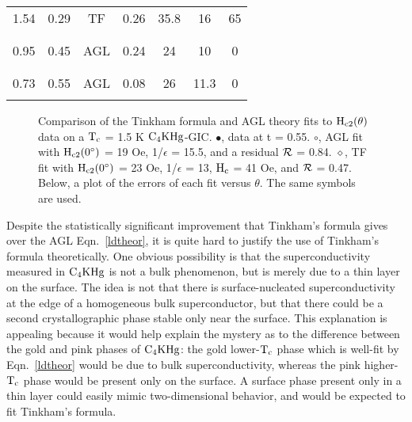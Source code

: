 \begin{table}
\begin{center}
\begin{tabular}{|l|cccccc|}
1.54 & 0.29 &TF  & 0.26 & 35.8 & 16  & 65 \\
& & & & & & \\
\hline
\hline
& & & & & & \\
0.95 & 0.45 & AGL& 0.24 & 24 & 10 & 0 \\
& & & & & & \\
\hline
\hline
& & & & & & \\
0.73\cite{iye82} & 0.55 & AGL & 0.08 & 26 & 11.3 & 0 \\
& & & & & & \\
\hline
\end{tabular}
\end{center}
\end{table}

\begin{figure}
\vspace{5in}
\caption[Comparison of the Tinkham formula and AGL theory fits to $\rm
H_{c2}(\theta)$ data on  a $\rm T_c$ =  1.5 K $\rm C_4KHg$-GIC.]{Comparison
of the Tinkham formula and AGL theory fits to  $\rm H_{c2}(\theta)$ data on
a  $\rm T_c$  =  1.5  K  $\rm C_4KHg$-GIC.   $\bullet$,  data at  t = 0.55.
$\circ$, AGL fit with $\rm H_{c2}(0^{\circ})$ = 19 Oe, 1/$\epsilon$ = 15.5,
and a  residual  $\cal    R$  =  0.84.    $\diamond$,   TF fit  with   $\rm
H_{c2}(0^{\circ})$ = 23 Oe, 1/$\epsilon$ = 13, $\rm H_c$ = 41 Oe, and $\cal
R$ = 0.47. Below, a plot of  the errors of  each fit versus  $\theta$.  The
same symbols are used.}
\label{TINKvsAGL}
\end{figure}

	Despite the  statistically  significant improvement that  Tinkham's
formula gives over the AGL Eqn.~\ref{ldtheor}, it is  quite hard to justify
the use  of Tinkham's  formula  theoretically.   One obvious possibility is
that  the  superconductivity  measured  in  $\rm C_4KHg  $  is  not  a bulk
phenomenon, but is merely due to a thin layer on the surface.  The idea is not
that  there is  surface-nucleated superconductivity   at  the   edge of   a
homogeneous  bulk superconductor, but     that  there could  be   a  second
crystallographic phase   stable only near the   surface.  This explanation is
appealing  because it would help explain  the  mystery as to the difference
between the gold and pink phases of $\rm C_4KHg $: the gold lower-$\rm T_c$
phase which is   well-fit  by   Eqn.~\ref{ldtheor}  would be   due to  bulk
superconductivity, whereas the pink higher-$\rm T_c$ phase would be present
only on  the surface.  A surface phase  present only in  a thin layer could
easily mimic  two-dimensional  behavior, and would    be   expected to  fit
Tinkham's formula.

